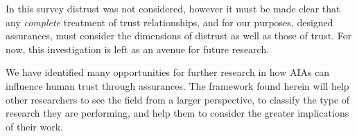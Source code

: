     In this survey distrust was not considered, however it must be made clear that any \emph{complete} treatment of trust relationships, and for our purposes, designed assurances, must consider the dimensions of distrust as well as those of trust. For now, this investigation is left as an avenue for future research.

    We have identified many opportunities for further research in how AIAs can influence human trust through assurances. The framework found herein will help other researchers to see the field from a larger perspective, to classify the type of research they are performing, and help them to consider the greater implications of their work.

\newpage

